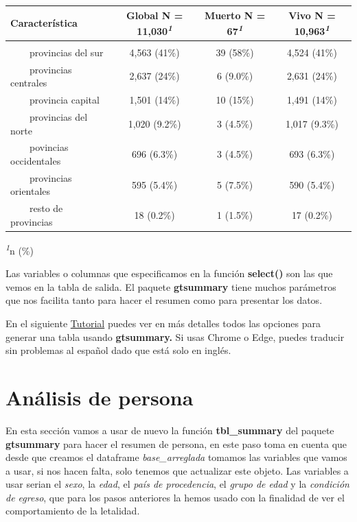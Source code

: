 \documentclass[
  letterpaper,
  DIV=11,
  numbers=noendperiod]{scrreprt}
\begin{document}
\begin{table}
\fontsize{12.0pt}{14.4pt}\selectfont
\begin{tabular*}{\linewidth}{@{\extracolsep{\fill}}lccc}
\toprule
\textbf{Característica} & \textbf{Global}  N = 11,030\textsuperscript{\textit{1}} & \textbf{Muerto}  N = 67\textsuperscript{\textit{1}} & \textbf{Vivo}  N = 10,963\textsuperscript{\textit{1}} \\ 
\midrule\addlinespace[2.5pt]
{\bfseries Provincias de residencia de los casos} &  &  &  \\ 
    provincias del sur & 4,563 (41\%) & 39 (58\%) & 4,524 (41\%) \\ 
    provincias centrales & 2,637 (24\%) & 6 (9.0\%) & 2,631 (24\%) \\ 
    provincia capital & 1,501 (14\%) & 10 (15\%) & 1,491 (14\%) \\ 
    provincias del norte & 1,020 (9.2\%) & 3 (4.5\%) & 1,017 (9.3\%) \\ 
    povincias occidentales & 696 (6.3\%) & 3 (4.5\%) & 693 (6.3\%) \\ 
    provincias orientales & 595 (5.4\%) & 5 (7.5\%) & 590 (5.4\%) \\ 
    resto de provincias & 18 (0.2\%) & 1 (1.5\%) & 17 (0.2\%) \\ 
\bottomrule
\end{tabular*}
\begin{minipage}{\linewidth}
\textsuperscript{\textit{1}}n (\%)\\
\end{minipage}
\end{table}

Las variables o columnas que especificamos en la función
\textbf{select()} son las que vemos en la tabla de salida. El paquete
\textbf{gtsummary} tiene muchos parámetros que nos facilita tanto para
hacer el resumen como para presentar los datos.

En el siguiente
\href{https://www.danieldsjoberg.com/gtsummary/articles/tbl_summary.html}{Tutorial}
puedes ver en más detalles todos las opciones para generar una tabla
usando \textbf{gtsummary.} Si usas Chrome o Edge, puedes traducir sin
problemas al español dado que está solo en inglés.

\section{Análisis de persona}\label{anuxe1lisis-de-persona}

En esta sección vamos a usar de nuevo la función \textbf{tbl\_summary}
del paquete \textbf{gtsummary} para hacer el resumen de persona, en este
paso toma en cuenta que desde que creamos el dataframe
\emph{base\_arreglada} tomamos las variables que vamos a usar, si nos
hacen falta, solo tenemos que actualizar este objeto. Las variables a
usar serian el \emph{sexo}, la \emph{edad}, el \emph{país de
procedencia}, el \emph{grupo de edad} y la \emph{condición de egreso},
que para los pasos anteriores la hemos usado con la finalidad de ver el
comportamiento de la letalidad.
\end{document}
